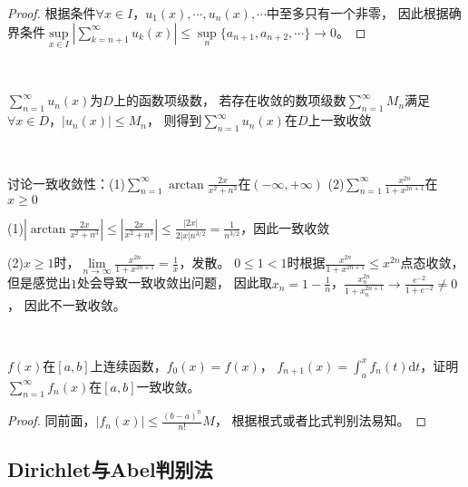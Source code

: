 \begin{proof}
  根据条件$\forall x \in I$，$u_1(x),\cdots,u_n(x),\cdots$中至多只有一个非零，
  因此根据确界条件$\sup \limits_{x \in I}|\sum\limits_{k = n+1}^{\infty}u_k(x)| \leq \sup\limits_n \{a_{n+1},a_{n+2},\cdots\} \rightarrow 0$。
\end{proof}

~

\begin{theorem}[M判别法]
  $\sum\limits_{n = 1}^{\infty}u_n(x)$为$D$上的函数项级数，
  若存在收敛的数项级数$\sum\limits_{n = 1}^{\infty}M_n$满足$\forall x \in D$，$|u_n(x)| \leq M_n$，
  则得到$\sum\limits_{n = 1}^{\infty}u_n(x)$在$D$上一致收敛
\end{theorem}

~

\begin{exercise}
  讨论一致收敛性：(1)$\sum\limits_{n = 1}^{\infty}\arctan \frac{2x}{x^2 + n^3}$在$(-\infty,+\infty)$
  (2)$\sum\limits_{n = 1}^{\infty}\frac{x^{2n}}{1 + x^{2n+1}}$在$x \geq 0$
\end{exercise}

\begin{solution}
  (1)$|\arctan \frac{2x}{x^2 + n^3}| \leq |\frac{2x}{x^2 + n^3}| \leq \frac{|2x|}{2|x| n^{3/2}} = \frac{1}{n^{3/2}}$，因此一致收敛

  (2)$x \geq 1$时，$\lim \limits _{n \rightarrow \infty} \frac{x^{2n}}{1 + x^{2n+1}} = \frac{1}{x}$，发散。
  $0 \leq 1 < 1$时根据$\frac{x^{2n}}{1 + x^{2n+1}} \leq x^{2n}$点态收敛，
  但是感觉出$1$处会导致一致收敛出问题，
  因此取$x_n = 1 - \frac{1}{n}$，$\frac{x_n^{2n}}{1 + x_n^{2n+1}} \rightarrow \frac{e^{-2}}{1 + e^{-2}} \neq 0$，
  因此不一致收敛。
\end{solution}

~

\begin{exercise}[积分格式]
  $f(x)$在$[a,b]$上连续函数，$f_0(x) = f(x)$，
  $f_{n+1}(x) = \int_a^x f_n(t)\mathrm{d} t$，证明$\sum\limits_{n = 1}^{\infty}f_n(x)$在$[a,b]$一致收敛。
\end{exercise}

\begin{proof}
  同前面，$|f_n(x)| \leq \frac{(b - a)^n}{n!}M$，
  根据根式或者比式判别法易知。
\end{proof}



\subsection{Dirichlet与Abel判别法}

